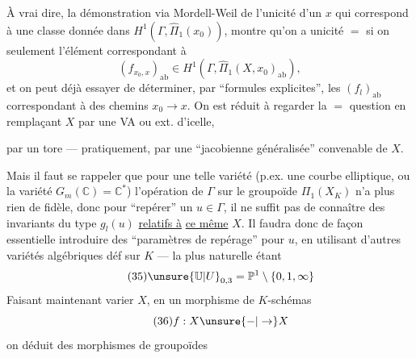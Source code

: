 À vrai dire, la démonstration via Mordell-Weil de l'unicité d'un $x$  qui correspond à une classe donnée dans $H^1(\Gamma,\widehat\Pi_1(x_0))$, montre qu'on a unicité $=$ si on   seulement l'élément correspondant à 
\[
\tag{34}(f_{x_0,x})_{\mathrm{ab}}\in H^1(\Gamma,\widehat\Pi_1(X,x_0)_{\mathrm{ab}}),
\]
et on peut déjà essayer de déterminer, par ``formules explicites'', les $(f_l)_{\mathrm{ab}}$ correspondant à des chemins $x_0\longrightarrow x$. On est réduit à regarder la $=$ question en remplaçant $X$ par une VA ou ext. d'icelle,


par un tore --- pratiquement, par une ``jacobienne généralisée'' convenable de $X$.

Mais il faut se rappeler que pour une telle variété (p.ex. une courbe elliptique, ou la variété $G_m(\mathbb C)=\mathbb C^*$) l'opération de $\Gamma$ sur le groupoïde $\Pi_1(X_K)$ n'a plus rien de fidèle, donc pour ``repérer'' un $u\in\Gamma$, il ne suffit pas de connaître des invariants du type $g_l(u)$ \uline{relatifs à} \uline{ce même} $X$. Il faudra donc de façon essentielle introduire des ``paramètres de repérage'' pour $u$, en utilisant d'autres variétés algébriques déf sur $K$ --- la plus naturelle étant
\[
\tag{35}\unsure{\mathbb U|U}_{0,3}=\mathbb P^1\setminus\{0,1,\infty\}
\]
Faisant maintenant varier $X$, en  un morphisme de $K$-schémas
\[
\tag{36}f:X\unsure{\mathbin{-}|\to}X
\]
on déduit des morphismes de groupoïdes

